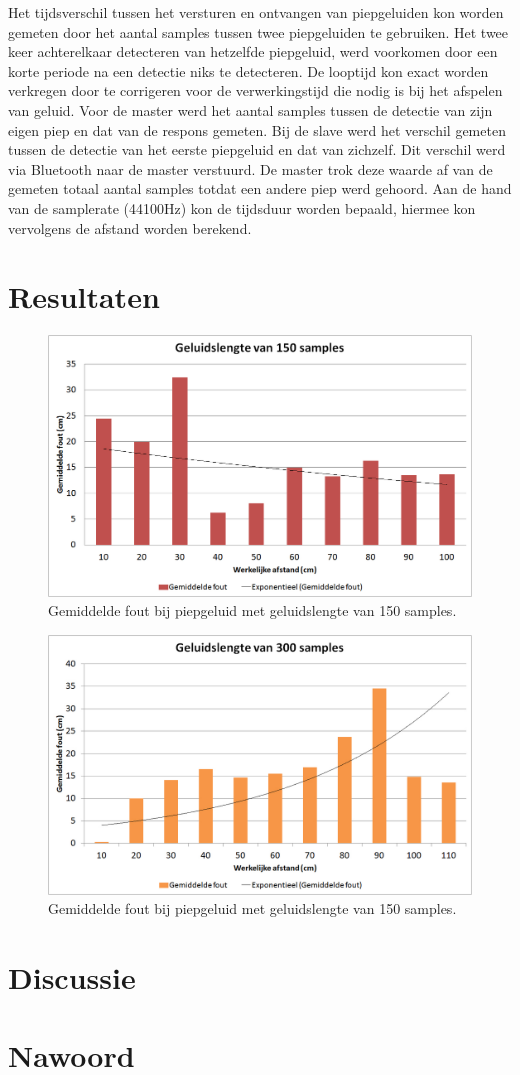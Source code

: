 \documentclass[12pt]{article}
\begin{document}
Het tijdsverschil tussen het versturen en ontvangen van piepgeluiden kon worden gemeten door het aantal samples tussen twee piepgeluiden te gebruiken. Het twee keer achterelkaar detecteren van hetzelfde piepgeluid, werd voorkomen door een korte periode na een detectie niks te detecteren. De looptijd kon exact worden verkregen door te corrigeren voor de verwerkingstijd die nodig is bij het afspelen van geluid. Voor de master werd het aantal samples tussen de detectie van zijn eigen piep en dat van de respons gemeten. Bij de slave werd het verschil gemeten tussen de detectie van het eerste piepgeluid en dat van zichzelf. Dit verschil werd via Bluetooth naar de master verstuurd. De master trok deze waarde af van de gemeten totaal aantal samples totdat een andere piep werd gehoord. Aan de hand van de samplerate (44100Hz) kon de tijdsduur worden bepaald, hiermee kon vervolgens de afstand worden berekend.

\section{Resultaten}
\begin{figure}[h]
\centering
\includegraphics[scale=0.4]{150-samples}
\caption{Gemiddelde fout bij piepgeluid met geluidslengte van 150 samples.}
\end{figure}

\begin{figure}[h]
\centering
\includegraphics[scale=0.4]{300-samples}
\caption{Gemiddelde fout bij piepgeluid met geluidslengte van 150 samples.}
\end{figure}

\section{Discussie}

\section{Nawoord}
\end{document}

